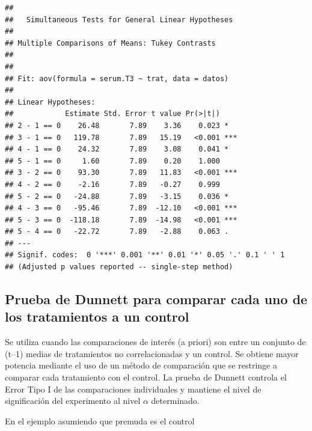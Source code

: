 \documentclass[]{book}
\newenvironment{Shaded}{\begin{snugshade}}{\end{snugshade}}
\newcommand{\KeywordTok}[1]{\textcolor[rgb]{0.13,0.29,0.53}{\textbf{#1}}}
\newcommand{\DataTypeTok}[1]{\textcolor[rgb]{0.13,0.29,0.53}{#1}}
\newcommand{\StringTok}[1]{\textcolor[rgb]{0.31,0.60,0.02}{#1}}
\newcommand{\OperatorTok}[1]{\textcolor[rgb]{0.81,0.36,0.00}{\textbf{#1}}}
\newcommand{\NormalTok}[1]{#1}
\begin{document}
\begin{verbatim}
## 
##   Simultaneous Tests for General Linear Hypotheses
## 
## Multiple Comparisons of Means: Tukey Contrasts
## 
## 
## Fit: aov(formula = serum.T3 ~ trat, data = datos)
## 
## Linear Hypotheses:
##            Estimate Std. Error t value Pr(>|t|)    
## 2 - 1 == 0    26.48       7.89    3.36    0.023 *  
## 3 - 1 == 0   119.78       7.89   15.19   <0.001 ***
## 4 - 1 == 0    24.32       7.89    3.08    0.041 *  
## 5 - 1 == 0     1.60       7.89    0.20    1.000    
## 3 - 2 == 0    93.30       7.89   11.83   <0.001 ***
## 4 - 2 == 0    -2.16       7.89   -0.27    0.999    
## 5 - 2 == 0   -24.88       7.89   -3.15    0.036 *  
## 4 - 3 == 0   -95.46       7.89  -12.10   <0.001 ***
## 5 - 3 == 0  -118.18       7.89  -14.98   <0.001 ***
## 5 - 4 == 0   -22.72       7.89   -2.88    0.063 .  
## ---
## Signif. codes:  0 '***' 0.001 '**' 0.01 '*' 0.05 '.' 0.1 ' ' 1
## (Adjusted p values reported -- single-step method)
\end{verbatim}

\subsection{Prueba de Dunnett para comparar cada uno de los tratamientos
a un
control}\label{prueba-de-dunnett-para-comparar-cada-uno-de-los-tratamientos-a-un-control}

Se utiliza cuando las comparaciones de interés (a priori) son entre un
conjunto de (t--1) medias de tratamientos no correlacionadas y un
control. Se obtiene mayor potencia mediante el uso de un método de
comparación que se restringe a comparar cada tratamiento con el control.
La prueba de Dunnett controla el Error Tipo I de las comparaciones
individuales y mantiene el nivel de significación del experimento al
nivel \(\alpha\) determinado.

En el ejemplo asumiendo que premuda es el control

\begin{Shaded}
\end{Shaded}
\end{document}
